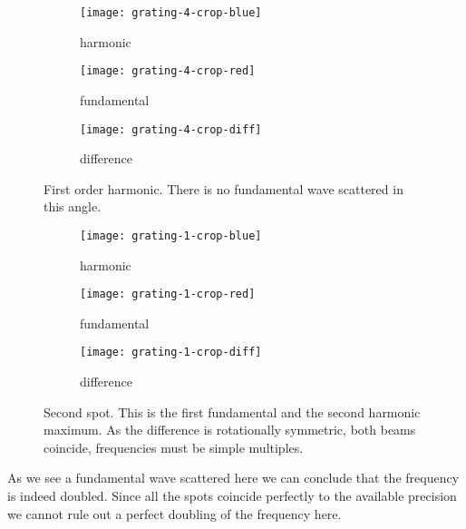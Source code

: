 \documentclass[11pt, english, fleqn, DIV=15, headinclude, BCOR=2cm]{scrreprt}
\begin{document}
\begin{figure}[p]
    \centering
    \begin{subfigure}[c]{0.3\linewidth}
        \centering
        \texttt{[image: grating-4-crop-blue]}
        \caption{%
            harmonic
            }
    \end{subfigure}
    \hfill
    \begin{subfigure}[c]{0.3\linewidth}
        \centering
        \texttt{[image: grating-4-crop-red]}
        \caption{%
            fundamental
            }
    \end{subfigure}
    \hfill
    \begin{subfigure}[c]{0.3\linewidth}
        \centering
        \texttt{[image: grating-4-crop-diff]}
        \caption{%
            difference
            }
    \end{subfigure}
    \caption{%
        First order harmonic. There is no fundamental wave scattered in this
        angle.
        }
    \label{fig:grating-4}
\end{figure}

\begin{figure}[p]
    \centering
    \begin{subfigure}[c]{0.3\linewidth}
        \centering
        \texttt{[image: grating-1-crop-blue]}
        \caption{%
            harmonic
            }
    \end{subfigure}
    \hfill
    \begin{subfigure}[c]{0.3\linewidth}
        \centering
        \texttt{[image: grating-1-crop-red]}
        \caption{%
            fundamental
            }
    \end{subfigure}
    \hfill
    \begin{subfigure}[c]{0.3\linewidth}
        \centering
        \texttt{[image: grating-1-crop-diff]}
        \caption{%
            difference
            }
    \end{subfigure}
    \caption{%
        Second spot. This is the first fundamental and the second harmonic
        maximum. As the difference is rotationally symmetric, both beams
        coincide, frequencies must be simple multiples.
        }
    \label{fig:grating-1}
\end{figure}

As we see a fundamental wave scattered here we can conclude that the frequency
is indeed doubled. Since all the spots coincide perfectly to the available
precision we cannot rule out a perfect doubling of the frequency here.
\end{document}
